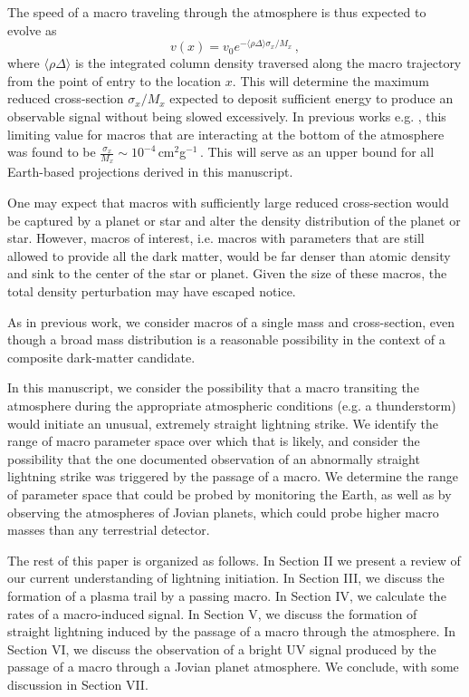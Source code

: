 \documentclass[%
 reprint,
 amsmath,amssymb,
 aps,
]{revtex4-2}
\newcommand{\vtwo}[1]{{\color{black} #1}}
\begin{document}
    The speed of a macro traveling through the atmosphere is thus expected to evolve as
    \begin{equation}\label{eq:atmo_velocity}
        v(x) = v_{0} e^{-\langle \rho \Delta\rangle \sigma_x/{M_x}}\,,
    \end{equation}
    where $\langle \rho \Delta\rangle$ is the integrated column density traversed along the macro trajectory from the point of entry to the location $x$. This will determine the maximum reduced cross-section $\sigma_x/M_x$ expected to deposit sufficient energy to produce an observable signal without being slowed excessively. In previous works e.g. \vtwo{\citet{Sidhu2019death, Sidhu2019bolide}}, this limiting value for macros that are interacting at the bottom of the atmosphere was found to be $\frac{\sigma_x}{M_x} \sim 10^{-4}\,$cm$^2$g$^{-1}\,$. This will serve as an upper bound for all Earth-based projections derived in this manuscript.

    \vtwo{One may expect that macros with sufficiently large reduced cross-section would be captured by a planet or star and alter the density distribution of the planet or star. However, macros of interest, i.e. macros with parameters that are still allowed to provide all the dark matter, would be far denser than atomic density and sink to the center of the star or planet. Given the size of these macros, the total density perturbation may have escaped notice.}

    As in previous work, we consider macros of a single mass and cross-section, even though a broad mass distribution is a reasonable possibility in the context of a composite dark-matter candidate.

    In this manuscript, we consider the possibility that a macro transiting the atmosphere during the appropriate atmospheric conditions (e.g. a thunderstorm) would initiate an unusual, extremely straight lightning strike. We identify the range of macro parameter space over which that is likely, and consider the possibility that the one documented observation of an abnormally straight lightning strike was triggered by the passage of a macro.  We determine the range of parameter space that could be probed by monitoring the Earth, as well as by observing the atmospheres of Jovian planets, which could probe higher macro masses than any terrestrial detector. 

    The rest of this paper is organized as follows. In Section II we present a review of our current understanding of lightning initiation. In Section III, we discuss the formation of a plasma trail by a passing macro. In Section IV, we calculate the rates of a macro-induced signal. \vtwo{In Section V, we discuss the formation of straight lightning induced by the passage of a macro through the atmosphere.} In Section VI, we discuss the observation of a bright UV signal produced by the passage of a macro through a Jovian planet atmosphere. We conclude, with some discussion in Section VII.
\end{document}
